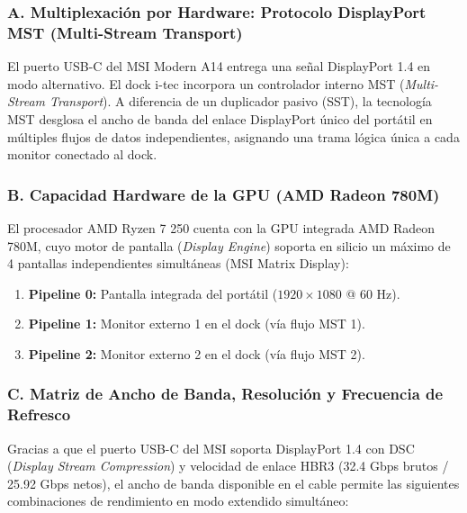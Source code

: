 \documentclass[11.5pt]{article}
\begin{document}
	\subsubsection*{A. Multiplexación por Hardware: Protocolo DisplayPort MST (Multi-Stream Transport)}
	
	El puerto USB-C del MSI Modern A14 entrega una señal DisplayPort 1.4 en modo alternativo. El dock i-tec incorpora un controlador interno MST (\textit{Multi-Stream Transport}). A diferencia de un duplicador pasivo (SST), la tecnología MST desglosa el ancho de banda del enlace DisplayPort único del portátil en múltiples flujos de datos independientes, asignando una trama lógica única a cada monitor conectado al dock.
	
	\subsubsection*{B. Capacidad Hardware de la GPU (AMD Radeon 780M)}
	
	El procesador AMD Ryzen 7 250 cuenta con la GPU integrada AMD Radeon 780M, cuyo motor de pantalla (\textit{Display Engine}) soporta en silicio un máximo de 4 pantallas independientes simultáneas (MSI Matrix Display):
	
	\begin{enumerate}
		\item \textbf{Pipeline 0:} Pantalla integrada del portátil ($1920 \times 1080$ @ 60 Hz).
		\item \textbf{Pipeline 1:} Monitor externo 1 en el dock (vía flujo MST 1).
		\item \textbf{Pipeline 2:} Monitor externo 2 en el dock (vía flujo MST 2).
	\end{enumerate}
	
	\subsubsection*{C. Matriz de Ancho de Banda, Resolución y Frecuencia de Refresco}
	
	Gracias a que el puerto USB-C del MSI soporta DisplayPort 1.4 con DSC (\textit{Display Stream Compression}) y velocidad de enlace HBR3 (32.4 Gbps brutos / 25.92 Gbps netos), el ancho de banda disponible en el cable permite las siguientes combinaciones de rendimiento en modo extendido simultáneo:
	
\end{document}
